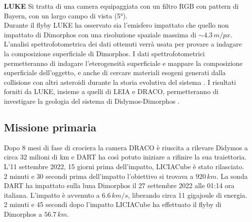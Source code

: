 \documentclass[a4paper,11pt,openright]{book}
\begin{document}
\qquad \small{\textbf{LUKE}} Si tratta di una camera equipaggiata con un filtro RGB con pattern di Bayern, con un largo campo di vista (5°).\\
Durante il flyby LUKE ha osservato sia l'emisfero impattato che quello non impattato di Dimorphos con una risoluzione spaziale massima di $\sim 4.3\,m/px$. L'analisi spettrofotometrica dei dati ottenuti verrà usata per provare a indagare la composizione superficiale di Dimorphos. I dati spettrofotometrici permetteranno di indagare l'eterogeneità superficiale e mappare la composizione superficiale dell'oggetto, e anche di cercare materiali esogeni generati dalla collisione con altri asteroidi durante la storia evolutiva del sistema \citep{poggiali_expected_2022}. I risultati forniti da LUKE, insieme a quelli di LEIA e DRACO, permetteranno di investigare la geologia del sistema di Didymos-Dimorphos \citep{pajola_anticipated_2022}.

\subsection{Missione primaria}
Dopo 8 mesi di fase di crociera la camera DRACO è riuscita a rilevare Didymos a circa 32 milioni di km e DART ha così potuto iniziare a rifinire la sua traiettoria. 
L'11 settembre 2022, 15 giorni prima dell'impatto, LICIACube è stato rilasciato. 2 minuti e 30 secondi prima dell'impatto l'obiettivo si trovava a $920\,km$. La sonda DART ha impattato sulla luna Dimorphos il 27 settembre 2022 alle 01:14 ora italiana.
L'impatto è avvenuto a $6.6\,km/s$, liberando circa 11 gigajoule di energia.
2 minuti e 45 secondi dopo l'impatto LICIACube ha effettuato il flyby di Dimorphos a $56.7\,km$.
\end{document}
